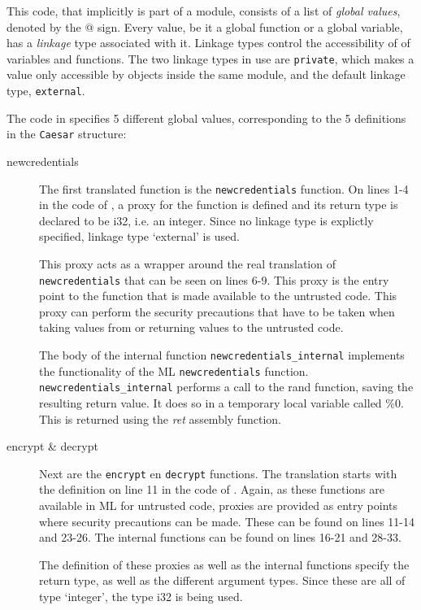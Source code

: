 This code, that implicitly is part of a module, consists of a list of \emph{global values}, denoted by the @ sign.
Every value, be it a global function or a global variable, has a \emph{linkage} type associated with it.
Linkage types control the accessibility of of variables and functions. The two linkage types in use are \texttt{private}, which makes a value only accessible by objects inside the same module, and the default linkage type, \texttt{external}.

The code in  specifies 5 different global values, corresponding to the 5 definitions in the \texttt{Caesar} structure:
\begin{description}
\item[newcredentials] The first translated function is the \texttt{newcredentials} function.
On lines 1-4 in the code of , a proxy for the function is defined and its return type is declared to be i32, i.e. an integer. Since no linkage type is explictly specified, linkage type `external'  is used.

This proxy acts as a wrapper around the real translation of \texttt{newcredentials} that can be seen on lines 6-9. This proxy is the entry point to the function that is made available to the untrusted code. This proxy can perform the security precautions that have to be taken when taking values from or returning values to the untrusted code.

The body of the internal function \texttt{newcredentials\_internal} implements the functionality of the ML \texttt{newcredentials} function.
\texttt{newcredentials\_internal} performs a call to the rand function, saving the resulting return value. It does so in a temporary local variable called \%0. This is returned using the \emph{ret} assembly function.

\item[encrypt \& decrypt] Next are the \texttt{encrypt} en \texttt{decrypt} functions. The translation starts with the definition on line 11 in the code of . Again, as these functions are available in ML for untrusted code, proxies are provided as entry points where security precautions can be made. These can be found on lines 11-14 and 23-26. The internal functions can be found on lines 16-21 and 28-33.

The definition of these proxies as well as the internal functions specify the return type, as well as the different argument types. Since these are all of type `integer', the type i32 is being used.


\end{description}
